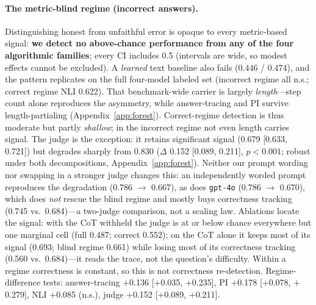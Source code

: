 \documentclass[11pt]{article}
\begin{document}
\paragraph{The metric-blind regime (incorrect answers).} Distinguishing honest from unfaithful error is opaque to every metric-based signal: \textbf{we detect no above-chance performance from any of the four algorithmic families}; every CI includes 0.5 (intervals are wide, so modest effects cannot be excluded). A \emph{learned} text baseline also fails (0.446 / 0.474), and the pattern replicates on the full four-model labeled set (incorrect regime all n.s.; correct regime NLI 0.622). That benchmark-wide carrier is largely \emph{length}---step count alone reproduces the asymmetry, while answer-tracing and PI survive length-partialing (Appendix~\ref{app:forest}). Correct-regime detection is thus moderate but partly \emph{shallow}; in the incorrect regime not even length carries signal. The judge is the exception: it retains significant signal (0.679 [0.633, 0.721]) but degrades sharply from 0.830 ($\Delta$ 0.152 [0.089, 0.211], $p{<}0.001$; robust under both decompositions, Appendix~\ref{app:forest}). Neither our prompt wording nor swapping in a stronger judge changes this: an independently worded prompt reproduces the degradation (0.786 $\to$ 0.667), as does \texttt{gpt-4o} (0.786 $\to$ 0.670), which does \emph{not} rescue the blind regime and mostly buys correctness tracking (0.745 vs.\ 0.684)---a two-judge comparison, not a scaling law. Ablations locate the signal: with the CoT withheld the judge is at or below chance everywhere but one marginal cell (full 0.487; correct 0.552); on the CoT alone it keeps most of its signal (0.693; blind regime 0.661) while losing most of its correctness tracking (0.560 vs.\ 0.684)---it reads the trace, not the question's difficulty. Within a regime correctness is constant, so this is not correctness re-detection. Regime-difference tests: answer-tracing $+$0.136 [$+$0.035, $+$0.235], PI $+$0.178 [$+$0.078, $+$0.279], NLI $+$0.085 (n.s.), judge $+$0.152 [$+$0.089, $+$0.211].
\end{document}
